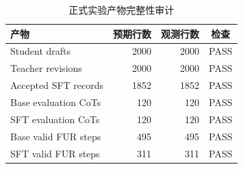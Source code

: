 \begin{table}[H]
\centering
\small
\caption{正式实验产物完整性审计}
\label{tab:integrity}
\begin{tabular}{lrrc}
\toprule
产物 & 预期行数 & 观测行数 & 检查 \\
\midrule
Student drafts & 2000 & 2000 & PASS \\
Teacher revisions & 2000 & 2000 & PASS \\
Accepted SFT records & 1852 & 1852 & PASS \\
Base evaluation CoTs & 120 & 120 & PASS \\
SFT evaluation CoTs & 120 & 120 & PASS \\
Base valid FUR steps & 495 & 495 & PASS \\
SFT valid FUR steps & 311 & 311 & PASS \\
\bottomrule
\end{tabular}
\end{table}
